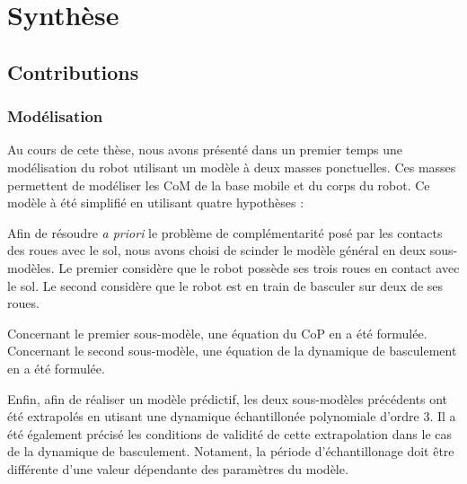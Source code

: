 \chapter{Synthèse}
	\section{Contributions}
	
	\subsection{Modélisation}
	  Au cours de cete thèse, nous avons présenté dans un premier temps une modélisation du robot utilisant un modèle à deux masses ponctuelles.
	  Ces masses permettent de modéliser les CoM de la base mobile et du corps du robot.
	  Ce modèle à été simplifié en utilisant quatre hypothèses :
	  
	  Afin de résoudre \textit{a priori} le problème de complémentarité posé par les contacts des roues avec le sol, nous avons choisi de scinder le modèle général en deux sous-modèles.
	  Le premier considère que le robot possède ses trois roues en contact avec le sol.
	  Le second considère que le robot est en train de basculer sur deux de ses roues.
	  
	  Concernant le premier sous-modèle, une équation du CoP en a été formulée.
	  Concernant le second sous-modèle, une équation de la dynamique de basculement en a été formulée.
	
	  Enfin, afin de réaliser un modèle prédictif, les deux sous-modèles précédents ont été extrapolés en utisant une dynamique échantillonée polynomiale d'ordre 3.
	  Il a été également précisé les conditions de validité de cette extrapolation dans le cas de la dynamique de basculement.
	  Notament, la période d'échantillonage doit être différente d'une valeur dépendante des paramètres du modèle. 
	
